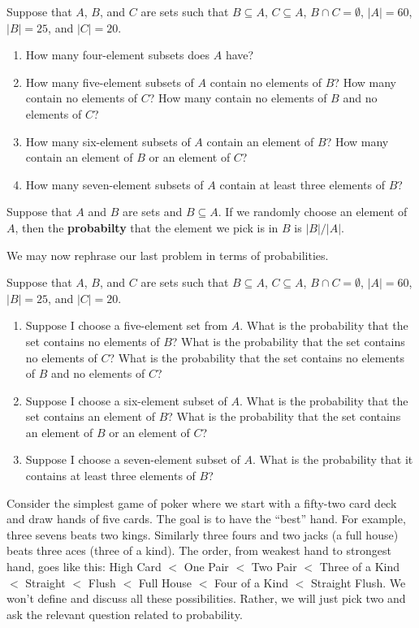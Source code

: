 \begin{prb}
Suppose that $A$, $B$, and $C$ are sets such that $B \subseteq A$, $C \subseteq A$, $B \cap C = \emptyset$, $|A| = 60$, $|B| = 25$, and $|C| = 20$.
\begin{enumerate}
\item  How many four-element subsets does $A$ have?
\item  How many five-element subsets of $A$ contain no elements of $B$? How many contain no elements of $C$? How many contain no elements of $B$ and no elements of $C$?
\item  How many six-element subsets of $A$ contain an element of $B$? How many contain an element of $B$ or an element of $C$?
\item  How many seven-element subsets of $A$ contain at least three elements of $B$?
\end{enumerate}
\end{prb}


\begin{dfn}
Suppose that $A$ and $B$ are sets and $B \subseteq A$.   If we randomly choose an element of $A$, then the \textbf{probabilty} that the element we pick is in $B$ is $|B|/|A|$.
\end{dfn}

We may now rephrase our last problem in terms of probabilities.

\begin{prb}
Suppose that $A$, $B$, and $C$ are sets such that $B \subseteq A$, $C \subseteq A$, $B \cap C = \emptyset$, $|A| = 60$, $|B| = 25$, and $|C| = 20$.
\begin{enumerate}
\item  Suppose I choose a five-element set from $A$. What is the probability that the set contains no elements of $B$? What is the probability that the set contains no elements of $C$? What is the probability that the set contains no elements of $B$ and no elements of $C$?
\item  Suppose I choose a six-element subset of $A$.  What is the probability that the set contains an element of $B$?   What is the probability that the set contains an element of $B$ or an element of $C$?
\item  Suppose I choose a seven-element subset of $A$.  What is the probability that it contains at least three elements of $B$?
\end{enumerate}
\end{prb}


Consider the simplest game of poker where we start with a fifty-two card deck and draw hands of five cards.  The goal is to have the ``best'' hand.   For example, three sevens beats two kings.   Similarly three fours and two jacks (a full house) beats three aces (three of a kind).  The order, from weakest hand to strongest hand, goes like this:   High Card $<$ One Pair $<$ Two Pair $<$ Three of a Kind $<$ Straight $<$ Flush $<$ Full House $<$ Four of a Kind $<$ Straight Flush.  We won't define and discuss all these possibilities.  Rather, we will just pick two and ask the relevant question related to probability.

